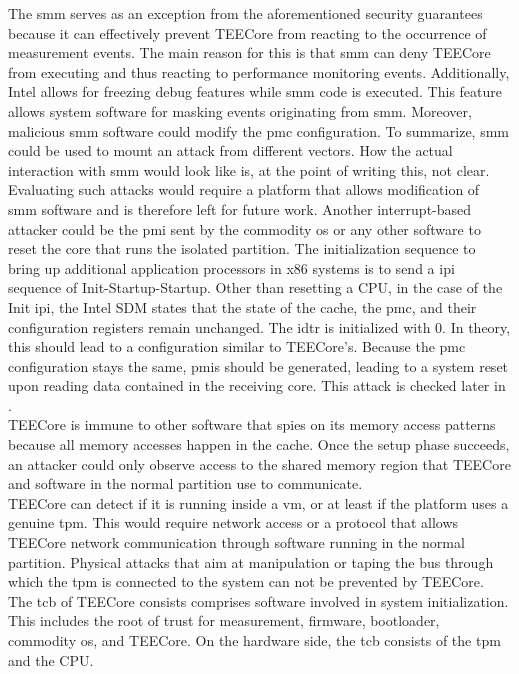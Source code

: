 The \gls{smm} serves as an exception from the aforementioned security guarantees
because it can effectively prevent TEECore from reacting to the occurrence of
measurement events. The main reason for this is that \gls{smm} can deny TEECore
from executing and thus reacting to performance monitoring events. Additionally,
Intel allows for freezing debug features while \gls{smm} code is executed. This
feature allows system software for masking events originating from
\gls{smm}.\cite{intel_sdm} Moreover, malicious \gls{smm} software could modify
the \gls{pmc} configuration. To summarize, \gls{smm} could be used to mount an
attack from different vectors. How the actual interaction with \gls{smm} would
look like is, at the point of writing this, not clear. Evaluating such attacks
would require a platform that allows modification of \gls{smm} software and is
therefore left for future work. Another interrupt-based attacker could be the
\gls{pmi} sent by the commodity \gls{os} or any other software to reset the core
that runs the isolated partition. The initialization sequence to bring up
additional application processors in x86 systems is to send a \gls{ipi} sequence
of Init-Startup-Startup. Other than resetting a CPU, in the case of the Init
\gls{ipi}, the Intel SDM states that the state of the cache, the \gls{pmc}, and
their configuration registers remain unchanged. The \gls{idtr} is initialized
with 0. In theory, this should lead to a configuration similar to TEECore's.
Because the \gls{pmc} configuration stays the same, \glspl{pmi} should be
generated, leading to a system reset upon reading data contained in the
receiving core. This attack is checked later in .\\

TEECore is immune to other software that spies on its memory access patterns
because all memory accesses happen in the cache. Once the setup phase succeeds,
an attacker could only observe access to the shared memory region that TEECore
and software in the normal partition use to communicate.\\

TEECore can detect if it is running inside a \gls{vm}, or at least if the
platform uses a genuine \gls{tpm}. This would require network access or a
protocol that allows TEECore network communication through software running in
the normal partition. Physical attacks that aim at manipulation or taping the
bus through which the \gls{tpm} is connected to the system can not be prevented
by TEECore. The \gls{tcb} of TEECore consists comprises software involved in
system initialization. This includes the root of trust for measurement,
firmware, bootloader, commodity \gls{os}, and TEECore. On the hardware side, the
\gls{tcb} consists of the \gls{tpm} and the CPU.

\cleardoublepage

